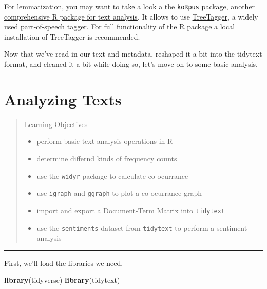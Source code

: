 \documentclass[]{book}
\newenvironment{Shaded}{\begin{snugshade}}{\end{snugshade}}
\newcommand{\KeywordTok}[1]{\textcolor[rgb]{0.13,0.29,0.53}{\textbf{#1}}}
\newcommand{\NormalTok}[1]{#1}
\providecommand{\tightlist}{%
  \setlength{\itemsep}{0pt}\setlength{\parskip}{0pt}}
\begin{document}
For lemmatization, you may want to take a look a the \href{https://CRAN.R-project.org/package=koRpus}{\texttt{koRpus}} package, another \href{https://cran.r-project.org/web/packages/koRpus/vignettes/koRpus_vignette.html}{comprehensive R package for text analysis}. It allows to use \href{http://www.cis.uni-muenchen.de/~schmid/tools/TreeTagger/}{TreeTagger}, a widely used part-of-speech tagger. For full functionality of the R package a local installation of TreeTagger is recommended.

Now that we've read in our text and metadata, reshaped it a bit into the tidytext format, and cleaned it a bit while doing so, let's move on to some basic analysis.

\hypertarget{textanalysis}{%
\chapter{Analyzing Texts}\label{textanalysis}}

\begin{quote}
Learning Objectives

\begin{itemize}
\tightlist
\item
  perform basic text analysis operations in R
\item
  determine differnd kinds of frequency counts
\item
  use the \texttt{widyr} package to calculate co-ocurrance
\item
  use \texttt{igraph} and \texttt{ggraph} to plot a co-ocurrance graph
\item
  import and export a Document-Term Matrix into \texttt{tidytext}
\item
  use the \texttt{sentiments} dataset from \texttt{tidytext} to perform a sentiment analysis
\end{itemize}
\end{quote}

\begin{center}\rule{0.5\linewidth}{\linethickness}\end{center}

First, we'll load the libraries we need.

\begin{Shaded}
\begin{Highlighting}[]
\KeywordTok{library}\NormalTok{(tidyverse)}
\KeywordTok{library}\NormalTok{(tidytext)}
\end{Highlighting}
\end{Shaded}
\end{document}
